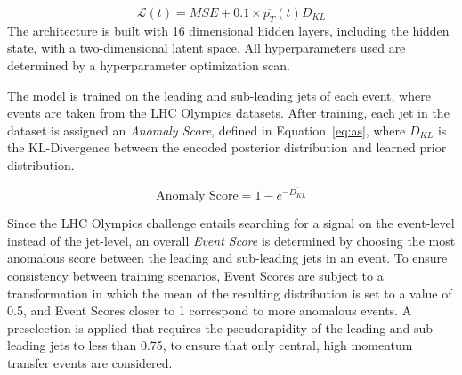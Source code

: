 \documentclass[letterpaper,11pt]{article}
\begin{document}
\begin{equation}
\mathcal{L}(t)=MSE+0.1 \times \overline{p_T}(t)D_{KL}
\end{equation}
The architecture is built with 16 dimensional hidden layers, including the hidden state, with a two-dimensional latent space. All hyperparameters used are determined by a hyperparameter optimization scan. 

The model is trained on the leading and sub-leading jets of each event, where events are taken from the LHC Olympics datasets. 
After training, each jet in the dataset is assigned an \textit{Anomaly Score}, defined in Equation~\ref{eq:as}, where $D_{KL}$ is the KL-Divergence between the encoded posterior distribution and learned prior distribution.

\begin{equation}
\label{eq:as}
\text{Anomaly Score} = 1 - e^{-\overline{D_{KL}}}
\end{equation}

Since the LHC Olympics challenge entails searching for a signal on the event-level instead of the jet-level, an overall \textit{Event Score} is determined by choosing the most anomalous score between the leading and sub-leading jets in an event. 
To ensure consistency between training scenarios, Event Scores are subject to a transformation in which the mean of the resulting distribution is set to a value of 0.5, and Event Scores closer to 1 correspond to more anomalous events. 
A preselection is applied that requires the pseudorapidity of the leading and sub-leading jets to less than 0.75, to ensure that only central, high momentum transfer events are considered. 
\end{document}
